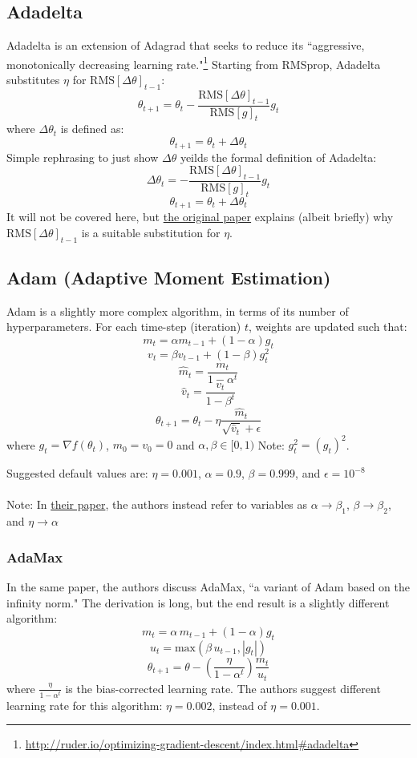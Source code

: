 \documentclass[fleqn]{article}
\begin{document}
\subsection{Adadelta}
Adadelta is an extension of Adagrad that seeks to reduce its ``aggressive,
monotonically decreasing learning rate."\footnote{
\url{http://ruder.io/optimizing-gradient-descent/index.html\#adadelta}}
Starting from RMSprop, Adadelta substitutes $\eta$ for
$\text{RMS}[\Delta \theta]_{t-1}$:
\[ \theta_{t+1} = \theta_t -
\frac{\text{RMS}[\Delta \theta]_{t-1}}{\text{RMS}[g]_t} g_t \]
where $\Delta \theta_t$ is defined as:
\[ \theta_{t+1} = \theta_t + \Delta \theta_t \]
Simple rephrasing to just show $\Delta \theta$ yeilds the formal
definition of Adadelta:
\[ \Delta \theta_t =
-\frac{\text{RMS}[\Delta \theta]_{t-1}}{\text{RMS}[g]_t} g_t \]
\[ \theta_{t+1} = \theta_t + \Delta \theta_t \]
It will not be covered here, but \href{https://arxiv.org/pdf/1212.5701.pdf}
{the original paper} explains (albeit briefly) why
$\text{RMS}[\Delta \theta]_{t-1}$ is a suitable substitution for $\eta$.

\subsection{Adam (Adaptive Moment Estimation)}
Adam is a slightly more complex algorithm, in terms of its number of
hyperparameters. For each time-step (iteration) $t$, weights are updated
such that:
\[ m_t = \alpha m_{t-1} + (1 - \alpha) g_t \]
\[ v_t = \beta v_{t-1} + (1 - \beta) g_t^2 \]
\[ \hat{m}_t = \frac{m_t}{1 - \alpha^t} \]
\[ \hat{v}_t = \frac{v_t}{1 - \beta^t} \]
\[ \theta_{t+1} = \theta_t -
\eta \frac{\hat{m}_t}{\sqrt{\hat{v}_t} + \epsilon} \]
where $g_t = \nabla f(\theta_t)$, $m_0 = v_0 = 0$ and
$\alpha, \beta \in [0, 1)$ Note: $g_t^2 = (g_t)^2$.

\noindent Suggested default values are: $\eta=0.001$, $\alpha=0.9$,
$\beta=0.999$, and $\epsilon=10^{-8}$
\\ \\
\noindent Note: In \href{https://arxiv.org/pdf/1412.6980.pdf}
{their paper}, the authors instead refer to variables as
$\alpha \rightarrow \beta_1$,
$\beta \rightarrow \beta_2$, and
$\eta \rightarrow \alpha$

\subsubsection{AdaMax}
In the same paper, the authors discuss AdaMax, ``a variant of Adam based
on the infinity norm." The derivation is long, but the end result is a
slightly different algorithm:
\[ m_t = \alpha \, m_{t-1} + (1 - \alpha) g_t \]
\[ u_t = \text{max}(\beta \, u_{t-1}, |g_t|)\]
\[ \theta_{t+1} = \theta - (\frac{\eta}{1-\alpha^t})\frac{m_t}{u_t} \]
where $\frac{\eta}{1-\alpha^t}$ is the bias-corrected learning rate. The
authors suggest different learning rate for this algorithm: $\eta=0.002$,
instead of $\eta=0.001$.
\end{document}
